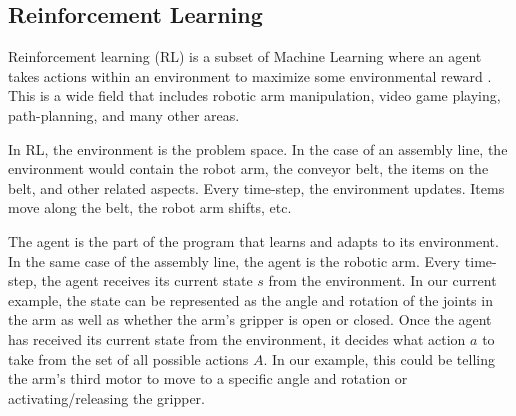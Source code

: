 \documentclass[letterpaper]{article} %
\begin{document}





\subsection{Reinforcement Learning}
Reinforcement learning (RL) is a subset of Machine Learning where an agent takes actions within an environment to maximize some environmental reward \cite{Sutton1998}. This is a wide field that includes robotic arm manipulation, video game playing, path-planning, and many other areas.

In RL, the environment is the problem space. In the case of an assembly line, the environment would contain the robot arm, the conveyor belt, the items on the belt, and other related aspects. Every time-step, the environment updates. Items move along the belt, the robot arm shifts, etc.

The agent is the part of the program that learns and adapts to its environment. In the same case of the assembly line, the agent is the robotic arm. Every time-step, the agent receives its current state $s$ from the environment. In our current example, the state can be represented as the angle and rotation of the joints in the arm as well as whether the arm’s gripper is open or closed. Once the agent has received its current state from the environment, it decides what action $a$ to take from the set of all possible actions $A$. In our example, this could be telling the arm’s third motor to move to a specific angle and rotation or activating/releasing the gripper.
\end{document}
